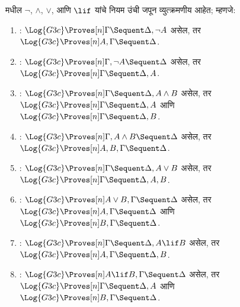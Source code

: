 \begin{lem}\label{pt:seq:inv:lem:G3c-invert}
 मधील $\lnot$, $\land$, $\lor$, आणि $\lif$
यांचे नियम उंची जपून व्युत्क्रमणीय आहेत;
म्हणजे:
\begin{enumerate}
  \item \RightR{\lnot}: $\Log{G3c} \Proves[n] \Gamma \Sequent
  \Delta, \lnot A$ असेल, तर $\Log{G3c} \Proves[n] A, \Gamma \Sequent
  \Delta$.
  \item \LeftR{\lnot}: $\Log{G3c} \Proves[n] \Gamma, \lnot A
  \Sequent \Delta$ असेल, तर $\Log{G3c} \Proves[n] \Gamma \Sequent \Delta,
  A$.
  \item \RightR{\land}: $\Log{G3c} \Proves[n] \Gamma \Sequent
  \Delta, A \land B$ असेल, तर $\Log{G3c} \Proves[n] \Gamma \Sequent
  \Delta, A$ आणि $\Log{G3c} \Proves[n] \Gamma \Sequent
  \Delta, B$.
  \item \LeftR{\land}: $\Log{G3c} \Proves[n] \Gamma, A \land B
  \Sequent \Delta$ असेल, तर $\Log{G3c} \Proves[n] A, B, \Gamma \Sequent
  \Delta$.
  \item \RightR{\lor}: $\Log{G3c} \Proves[n] \Gamma \Sequent
  \Delta, A \lor B$ असेल, तर $\Log{G3c} \Proves[n] \Gamma \Sequent
  \Delta, A, B$.
  \item \LeftR{\lor}: $\Log{G3c} \Proves[n] A \lor B, \Gamma \Sequent
  \Delta$ असेल, तर $\Log{G3c} \Proves[n] A, \Gamma \Sequent
  \Delta$ आणि $\Log{G3c} \Proves[n] B, \Gamma \Sequent
  \Delta$.
  \item \RightR{\lif}: $\Log{G3c} \Proves[n] \Gamma \Sequent
  \Delta, A \lif B$ असेल, तर $\Log{G3c} \Proves[n] A, \Gamma \Sequent
  \Delta, B$.
  \item \LeftR{\lif}: $\Log{G3c} \Proves[n] A \lif B, \Gamma
  \Sequent \Delta$ असेल, तर $\Log{G3c} \Proves[n] \Gamma \Sequent \Delta,
  A$ आणि $\Log{G3c} \Proves[n] B, \Gamma \Sequent \Delta$.
\end{enumerate}
\end{lem}

